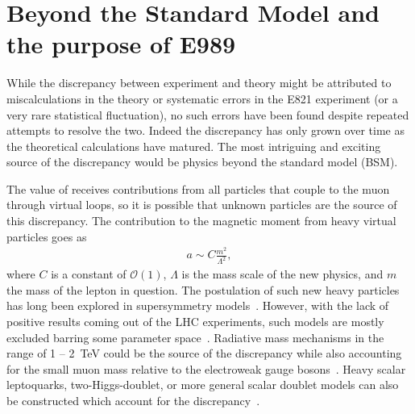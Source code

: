 \section{Beyond the Standard Model and the purpose of E989}
\label{sec:BSM}


While the discrepancy between experiment and theory might be attributed to miscalculations in the theory or systematic errors in the E821 experiment (or a very rare statistical fluctuation), no such errors have been found despite repeated attempts to resolve the two. Indeed the discrepancy has only grown over time as the theoretical calculations have matured. The most intriguing and exciting source of the discrepancy would be physics beyond the standard model (BSM). 


The value of \amu receives contributions from all particles that couple to the muon through virtual loops, so it is possible that unknown particles are the source of this discrepancy. The contribution to the magnetic moment from heavy virtual particles goes as 
		\begin{align}
            a \sim C \frac{m^{2}}{\Lambda^{2}},
		\end{align}
where $C$ is a constant of $\mathcal{O}(1)$, $\Lambda$ is the mass scale of the new physics, and $m$ the mass of the lepton in question. The postulation of such new heavy particles has long been explored in supersymmetry models~\cite{Czarnecki_2001}. However, with the lack of positive results coming out of the LHC experiments, such models are mostly excluded barring some parameter space~\cite{Hagiwara_2018}. Radiative mass mechanisms in the range of 1 -- \SI{2}{\TeV} could be the source of the discrepancy while also accounting for the small muon mass relative to the electroweak gauge bosons~\cite{Czarnecki_2001}. Heavy scalar leptoquarks, two-Higgs-doublet, or more general scalar doublet models can also be constructed which account for the discrepancy~\cite{Leskow_2017,crivellin2019bto,Abe_2019}.



